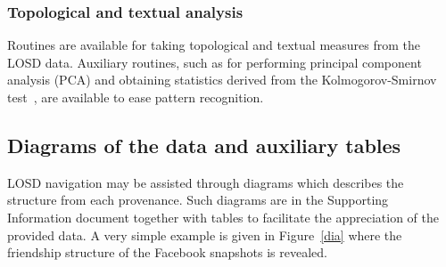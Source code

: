 \documentclass[review]{elsarticle}
\begin{document}
\subsubsection{Topological and textual analysis}\label{ana}
Routines are available for taking topological and textual measures from
the LOSD data.
  Auxiliary routines, such as for performing principal component analysis (PCA)
  and obtaining statistics derived from the Kolmogorov-Smirnov test~\cite{kol}, are available to ease pattern recognition.



\subsection{Diagrams of the data and auxiliary tables}\label{sdia}
LOSD navigation may be assisted through diagrams which describes
the structure from each provenance.
Such diagrams are in the Supporting Information document
together with tables to facilitate the appreciation of the provided data.
A very simple example is given in Figure~\ref{dia} where the friendship
structure of the Facebook snapshots is revealed.
\end{document}
